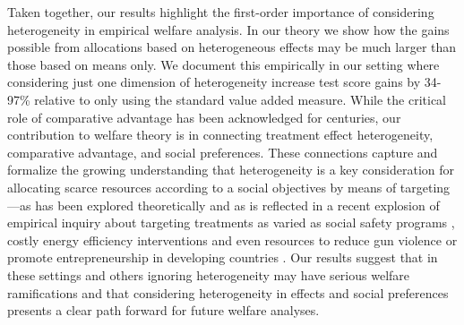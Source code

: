 \documentclass[12pt]{article}
\theoremstyle{definition}
\theoremstyle{definition}
\theoremstyle{definition}
\theoremstyle{definition}
\begin{document}
Taken together, our results highlight the first-order importance of considering heterogeneity in empirical welfare analysis. In our theory we show how the gains possible from allocations based on heterogeneous effects may be much larger than those based on means only. We document this empirically in our setting where considering just one dimension of heterogeneity increase test score gains by 34-97\% relative to only using the standard value added measure. While the critical role of comparative advantage has been acknowledged for centuries, our contribution to welfare theory is in connecting treatment effect heterogeneity, comparative advantage, and social preferences. These connections capture and formalize the growing understanding that heterogeneity is a key consideration for allocating scarce resources according to a social objectives by means of targeting---as has been explored theoretically \citep{kitagawa2018should,athey2021policy} and as is reflected in a recent explosion of empirical inquiry about targeting treatments as varied as social safety programs \citep{alatas2016self,finkelstein2019take}, costly energy efficiency interventions \citep{ito2021selection,ida2022choosing} and even resources to reduce gun violence \citep{bhatt2023predicting} or promote entrepreneurship in developing countries \citep{hussam2022targeting}. Our results suggest that in these settings and others ignoring heterogeneity may have serious welfare ramifications and that considering heterogeneity in effects and social preferences presents a clear path forward for future welfare analyses.












\end{document}
